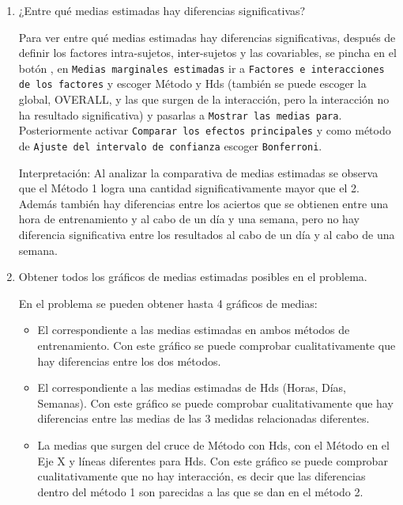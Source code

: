 \begin{enumerate}
\begin{enumerate}
\item ¿Entre qué medias estimadas hay diferencias significativas?

\begin{indicacion}{Para ver entre qué medias estimadas hay diferencias significativas, después de definir los factores intra-sujetos, inter-sujetos y las covariables, se pincha en el botón , en \texttt{Medias marginales estimadas} ir a \texttt{Factores e interacciones de los factores} y escoger \textsf{Método} y \textsf{Hds} (también se puede escoger la global, \textsf{OVERALL}, y las que surgen de la interacción, pero la interacción no ha resultado significativa) y pasarlas a \texttt{Mostrar las medias para}. Posteriormente activar \texttt{Comparar los efectos principales} y como método de \texttt{Ajuste del intervalo de confianza} escoger \texttt{Bonferroni}.

Interpretación: Al analizar la comparativa de medias estimadas se observa que el Método 1 logra una cantidad significativamente mayor que el 2. Además también hay diferencias entre los aciertos que se obtienen entre una hora de entrenamiento y al cabo de un día y una semana, pero no hay diferencia significativa entre los resultados al cabo de un día y al cabo de una semana.

}
\end{indicacion}

\item Obtener todos los gráficos de medias estimadas posibles en el problema.

\begin{indicacion}{En el problema se pueden obtener hasta 4 gráficos de medias:

\begin{itemize}

\item El correspondiente a las medias estimadas en ambos métodos de entrenamiento. Con este gráfico se puede comprobar cualitativamente que hay diferencias entre los dos métodos.

\item El correspondiente a las medias estimadas de Hds (Horas, Días, Semanas). Con este gráfico se puede comprobar cualitativamente que hay diferencias entre las medias de las 3 medidas relacionadas diferentes.

\item La medias que surgen del cruce de Método con Hds, con el Método en el Eje X y líneas diferentes para Hds. Con este gráfico se puede comprobar cualitativamente que no hay interacción, es decir que las diferencias dentro del método 1 son parecidas a las que se dan en el método 2.


\end{itemize}}
\end{indicacion}
\end{enumerate}
\end{enumerate}
